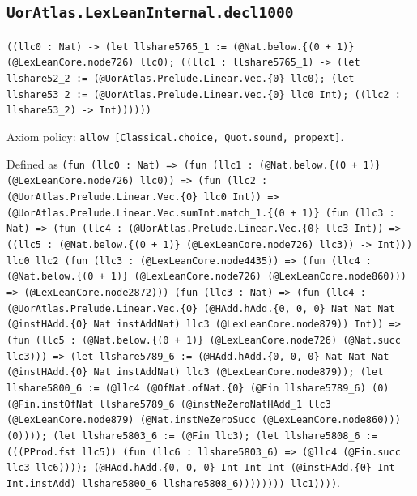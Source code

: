 \documentclass[11pt]{article}
\begin{document}
\subsection*{\texttt{UorAtlas.LexLeanInternal.decl1000}}
\noindent\texttt{((llc0 : Nat) -> (let llshare5765\_1 := (@Nat.below.\{(0 + 1)\} (@LexLeanCore.node726) llc0); ((llc1 : llshare5765\_1) -> (let llshare52\_2 := (@UorAtlas.Prelude.Linear.Vec.\{0\} llc0); (let llshare53\_2 := (@UorAtlas.Prelude.Linear.Vec.\{0\} llc0 Int); ((llc2 : llshare53\_2) -> Int))))))}\par
\noindent Axiom policy: \texttt{allow [Classical.choice, Quot.sound, propext]}.\par
\noindent Defined as \texttt{(fun (llc0 : Nat) => (fun (llc1 : (@Nat.below.\{(0 + 1)\} (@LexLeanCore.node726) llc0)) => (fun (llc2 : (@UorAtlas.Prelude.Linear.Vec.\{0\} llc0 Int)) => (@UorAtlas.Prelude.Linear.Vec.sumInt.match\_1.\{(0 + 1)\} (fun (llc3 : Nat) => (fun (llc4 : (@UorAtlas.Prelude.Linear.Vec.\{0\} llc3 Int)) => ((llc5 : (@Nat.below.\{(0 + 1)\} (@LexLeanCore.node726) llc3)) -> Int))) llc0 llc2 (fun (llc3 : (@LexLeanCore.node4435)) => (fun (llc4 : (@Nat.below.\{(0 + 1)\} (@LexLeanCore.node726) (@LexLeanCore.node860))) => (@LexLeanCore.node2872))) (fun (llc3 : Nat) => (fun (llc4 : (@UorAtlas.Prelude.Linear.Vec.\{0\} (@HAdd.hAdd.\{0, 0, 0\} Nat Nat Nat (@instHAdd.\{0\} Nat instAddNat) llc3 (@LexLeanCore.node879)) Int)) => (fun (llc5 : (@Nat.below.\{(0 + 1)\} (@LexLeanCore.node726) (@Nat.succ llc3))) => (let llshare5789\_6 := (@HAdd.hAdd.\{0, 0, 0\} Nat Nat Nat (@instHAdd.\{0\} Nat instAddNat) llc3 (@LexLeanCore.node879)); (let llshare5800\_6 := (@llc4 (@OfNat.ofNat.\{0\} (@Fin llshare5789\_6) (0) (@Fin.instOfNat llshare5789\_6 (@instNeZeroNatHAdd\_1 llc3 (@LexLeanCore.node879) (@Nat.instNeZeroSucc (@LexLeanCore.node860))) (0)))); (let llshare5803\_6 := (@Fin llc3); (let llshare5808\_6 := (((PProd.fst llc5)) (fun (llc6 : llshare5803\_6) => (@llc4 (@Fin.succ llc3 llc6)))); (@HAdd.hAdd.\{0, 0, 0\} Int Int Int (@instHAdd.\{0\} Int Int.instAdd) llshare5800\_6 llshare5808\_6)))))))) llc1))))}.\par
\end{document}

